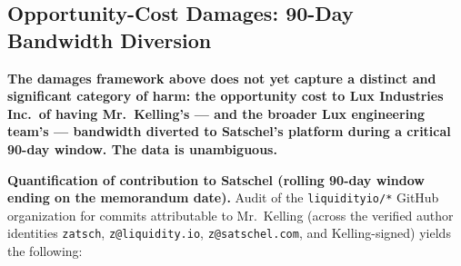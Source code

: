 \documentclass[11pt,letterpaper]{article}
\begin{document}
\subsection*{Opportunity-Cost Damages: 90-Day Bandwidth Diversion}

\textbf{The damages framework above does not yet capture a distinct
and significant category of harm: the opportunity cost to Lux
Industries Inc.\ of having Mr.\ Kelling's --- and the broader Lux
engineering team's --- bandwidth diverted to Satschel's platform
during a critical 90-day window. The data is unambiguous.}

\textbf{Quantification of contribution to Satschel (rolling 90-day
window ending on the memorandum date).} Audit of the
\texttt{liquidityio/*} GitHub organization for commits attributable
to Mr.\ Kelling (across the verified author identities
\texttt{zatsch}, \texttt{z@liquidity.io}, \texttt{z@satschel.com},
and Kelling-signed) yields the following:
\end{document}
